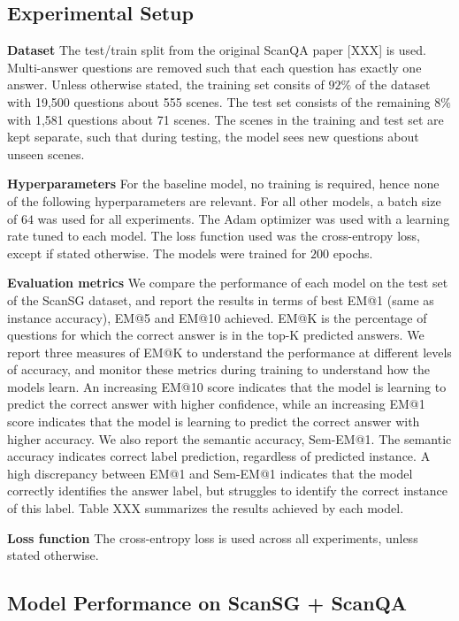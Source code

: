 \subsection{Experimental Setup}

\bigskip
\noindent \textbf{Dataset}
The test/train split from the original ScanQA paper [XXX] is used. Multi-answer questions are removed such that each question has exactly one answer. Unless otherwise stated, the training set consits of $92\%$ of the dataset with 19,500 questions about 555 scenes. The test set consists of the remaining $8\%$ with 1,581 questions about 71 scenes. The scenes in the training and test set are kept separate, such that during testing, the model sees new questions about unseen scenes.

\bigskip
\noindent \textbf{Hyperparameters}
For the baseline model, no training is required, hence none of the following hyperparameters are relevant. For all other models, a batch size of $64$ was used for all experiments. The Adam optimizer was used with a learning rate tuned to each model. The loss function used was the cross-entropy loss, except if stated otherwise. The models were trained for $200$ epochs.

\bigskip
\noindent \textbf{Evaluation metrics}
We compare the performance of each model on the test set of the ScanSG dataset, and report the results in terms of best EM@1 (same as instance accuracy), EM@5 and EM@10 achieved. EM@K is the percentage of questions for which the correct answer is in the top-K predicted answers. We report three measures of EM@K to understand the performance at different levels of accuracy, and monitor these metrics during training to understand how the models learn. An increasing EM@10 score indicates that the model is learning to predict the correct answer with higher confidence, while an increasing EM@1 score indicates that the model is learning to predict the correct answer with higher accuracy. We also report the semantic accuracy, Sem-EM@1. The semantic accuracy indicates correct label prediction, regardless of predicted instance. A high discrepancy between EM@1 and Sem-EM@1 indicates that the model correctly identifies the answer label, but struggles to identify the correct instance of this label. Table XXX summarizes the results achieved by each model.

\bigskip
\noindent \textbf{Loss function}
The cross-entropy loss is used across all experiments, unless stated otherwise.

\subsection{Model Performance on ScanSG + ScanQA}

